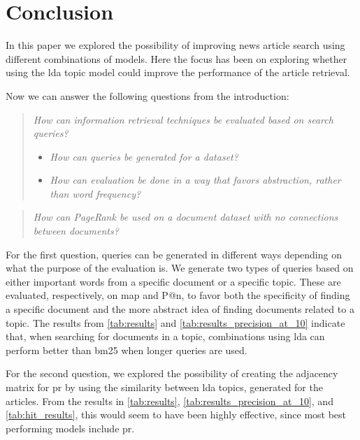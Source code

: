 \section{Conclusion}\label{sec:conclusion}
In this paper we explored the possibility of improving news article search using different combinations of models.
Here the focus has been on exploring whether using the \gls{lda} topic model could improve the performance of the article retrieval.

Now we can answer the following questions from the introduction:
\begin{quote}
	\emph{How can information retrieval techniques be evaluated based on search queries?}
	\begin{itemize}
		\item \emph{How can queries be generated for a dataset?}
		\item \emph{How can evaluation be done in a way that favors abstraction, rather than word frequency?}
	\end{itemize}
\end{quote}
\vspace{0.1 cm}

\begin{quote}
	\emph{How can PageRank be used on a document dataset with no connections between documents?}
\end{quote}

For the first question, queries can be generated in different ways depending on what the purpose of the evaluation is.
We generate two types of queries based on either important words from a specific document or a specific topic.
These are evaluated, respectively, on \acrlong{map} and P@n, to favor both the specificity of finding a specific document and the more abstract idea of finding documents related to a topic.
The results from \autoref{tab:results} and \autoref{tab:results_precision_at_10} indicate that, when searching for documents in a topic, combinations using \gls{lda} can perform better than \gls{bm25} when longer queries are used.

For the second question, we explored the possibility of creating the adjacency matrix for \gls{pr} by using the similarity between \gls{lda} topics, generated for the articles.
From the results in \autoref{tab:results}, \autoref{tab:results_precision_at_10}, and \autoref{tab:hit_results}, this would seem to have been highly effective, since most best performing models include \gls{pr}.